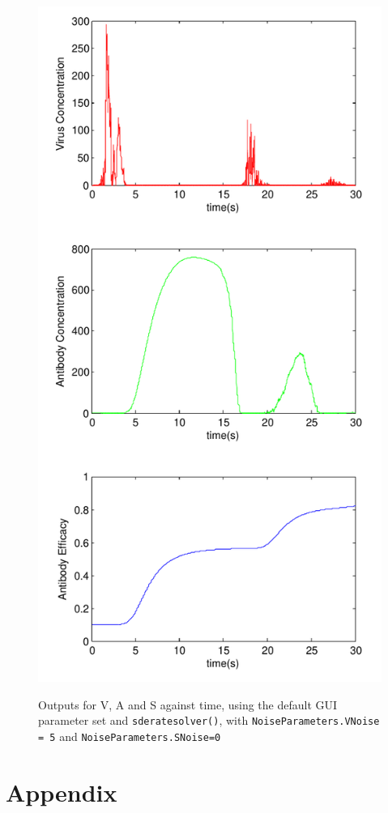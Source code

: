 \documentclass[a4paper, 12pt]{report}
\begin{document}
\begin{figure}
\begin{center}
\includegraphics[width=120mm]{Resurgance_scissored.pdf}
\label{resurgance}
\caption{Outputs for V, A and S against time, using the default GUI parameter set and \texttt{sderatesolver()}, with \texttt{NoiseParameters.VNoise = 5} and \texttt{NoiseParameters.SNoise=0}}
\end{center}
\end{figure}

\chapter{Appendix}



\end{document}
